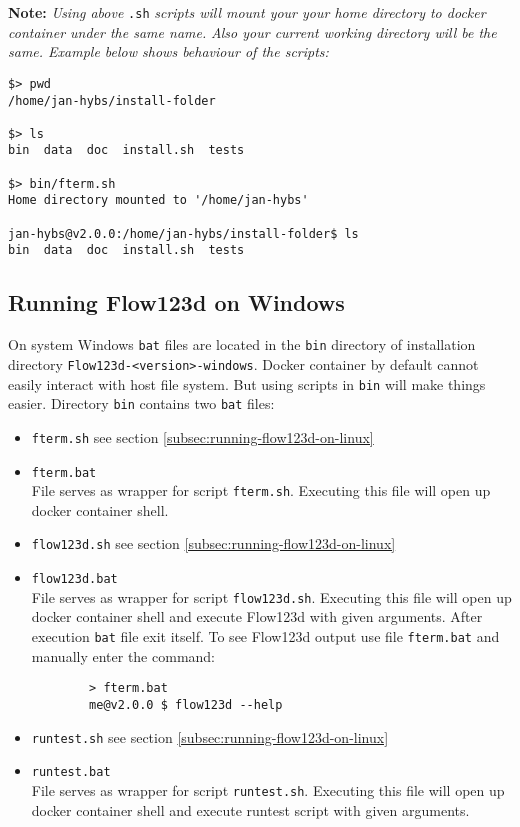 \documentclass[12pt,a4paper]{report}
\begin{document}
\textbf{Note:}
\textit{Using above} \verb'.sh' \textit{scripts will mount your your home  directory to docker container under the same name.}
\textit{Also your current working directory will be the same. Example below shows behaviour of the scripts:}
\begin{verbatim}
$> pwd
/home/jan-hybs/install-folder

$> ls
bin  data  doc	install.sh  tests

$> bin/fterm.sh
Home directory mounted to '/home/jan-hybs'

jan-hybs@v2.0.0:/home/jan-hybs/install-folder$ ls
bin  data  doc	install.sh  tests
\end{verbatim}


\subsection{Running Flow123d on Windows}
On system Windows \verb'bat' files are located in the \verb'bin' directory of installation directory \verb'Flow123d-<version>-windows'.
Docker container by default cannot easily interact with host file system. But using scripts in \verb'bin' will make things easier.
Directory \verb'bin' contains two \verb'bat' files:
\begin{itemize}
	\item \verb'fterm.sh' see section \ref{subsec:running-flow123d-on-linux}
	
	\item \verb'fterm.bat' \\
	File serves as wrapper for script \verb'fterm.sh'. Executing this file will open up docker container shell.

	\item \verb'flow123d.sh' see section \ref{subsec:running-flow123d-on-linux}	
	
	\item \verb'flow123d.bat' \\
	File serves as wrapper for script \verb'flow123d.sh'. Executing this file will open up docker container shell and execute 
	Flow123d with given arguments. After execution \verb'bat' file exit itself. To see Flow123d output use file \verb'fterm.bat'
	and manually enter the command:
	\begin{verbatim}
		> fterm.bat
		me@v2.0.0 $ flow123d --help
	\end{verbatim}

	\item \verb'runtest.sh' see section \ref{subsec:running-flow123d-on-linux}	
	
	\item \verb'runtest.bat' \\
	File serves as wrapper for script \verb'runtest.sh'. Executing this file will open up docker container shell and execute 
	runtest script with given arguments.
\end{itemize}
\end{document}
